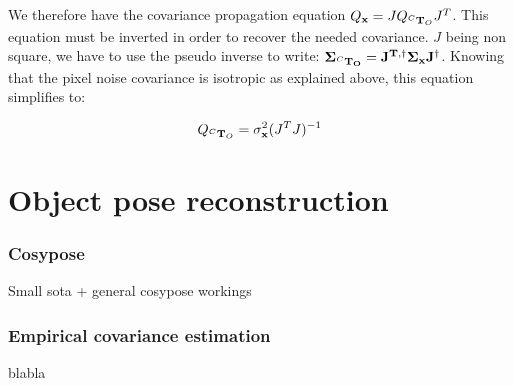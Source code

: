 We therefore have the covariance propagation equation $Q_{{\bf x}} = J Q_{\prescript{C}{}{{\bf T}}_{O}} J^T$. 
This equation must be inverted in order to recover the needed covariance. $J$ being non square, 
we have to use the pseudo inverse to write: $\bf \Sigma_{\prescript{C}{}{{\bf T}}_{O}} = J^{T,\dagger} \bf \Sigma_{{\bf x}} J^{\dagger}$. 
Knowing that the pixel noise covariance is isotropic as explained above, this equation simplifies to:

\begin{equation}
Q_{\prescript{C}{}{{\bf T}}_{O}} = \sigma_{{\bf x}}^2(J^T J)^{-1}    
\end{equation}




\section{Object pose reconstruction}
\subsubsection{Cosypose}
Small sota + general cosypose workings
\subsubsection{Empirical covariance estimation}
blabla